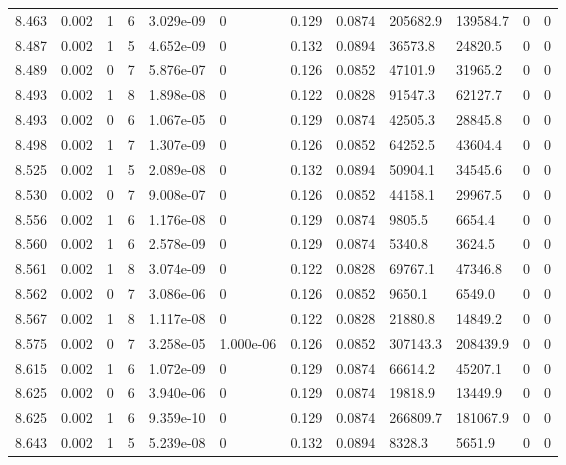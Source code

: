 \documentclass[preview]{standalone}
\begin{document}
{{{{{{{{{{\begin{tabular}{L{1.2cm}C{1.2cm} C{0.3cm}C{0.5cm} C{1.4cm}C{1.4cm} C{1.4cm}C{1.4cm} C{1.6cm}C{1.6cm} C{1.6cm}C{1.6cm}}
  8.463  &  0.002  & 1     &  6 &  3.029e-09  & 0  &  0.129&   0.0874& 205682.9 & 139584.7   &  0 & 0  \\ 
  8.487  &  0.002  & 1     &  5 &  4.652e-09  & 0  &  0.132&   0.0894& 36573.8 & 24820.5   &  0 & 0  \\ 
  8.489  &  0.002  & 0     &  7 &  5.876e-07  & 0  &  0.126&   0.0852& 47101.9 & 31965.2   &  0 & 0  \\ 
  8.493  &  0.002  & 1     &  8 &  1.898e-08  & 0  &  0.122&   0.0828& 91547.3 & 62127.7   &  0 & 0  \\ 
  8.493  &  0.002  & 0     &  6 &  1.067e-05  & 0  &  0.129&   0.0874& 42505.3 & 28845.8   &  0 & 0  \\ 
  8.498  &  0.002  & 1     &  7 &  1.307e-09  & 0  &  0.126&   0.0852& 64252.5 & 43604.4   &  0 & 0  \\ 
  8.525  &  0.002  & 1     &  5 &  2.089e-08  & 0  &  0.132&   0.0894& 50904.1 & 34545.6   &  0 & 0  \\ 
  8.530  &  0.002  & 0     &  7 &  9.008e-07  & 0  &  0.126&   0.0852& 44158.1 & 29967.5   &  0 & 0  \\ 
  8.556  &  0.002  & 1     &  6 &  1.176e-08  & 0  &  0.129&   0.0874& 9805.5 & 6654.4   &  0 & 0  \\ 
  8.560  &  0.002  & 1     &  6 &  2.578e-09  & 0  &  0.129&   0.0874& 5340.8 & 3624.5   &  0 & 0  \\ 
  8.561  &  0.002  & 1     &  8 &  3.074e-09  & 0  &  0.122&   0.0828& 69767.1 & 47346.8   &  0 & 0  \\ 
  8.562  &  0.002  & 0     &  7 &  3.086e-06  & 0  &  0.126&   0.0852& 9650.1 & 6549.0   &  0 & 0  \\ 
  8.567  &  0.002  & 1     &  8 &  1.117e-08  & 0  &  0.122&   0.0828& 21880.8 & 14849.2   &  0 & 0  \\ 
  8.575  &  0.002  & 0     &  7 &  3.258e-05  & 1.000e-06  &  0.126&   0.0852& 307143.3 & 208439.9   &  0 & 0  \\ 
  8.615  &  0.002  & 1     &  6 &  1.072e-09  & 0  &  0.129&   0.0874& 66614.2 & 45207.1   &  0 & 0  \\ 
  8.625  &  0.002  & 0     &  6 &  3.940e-06  & 0  &  0.129&   0.0874& 19818.9 & 13449.9   &  0 & 0  \\ 
  8.625  &  0.002  & 1     &  6 &  9.359e-10  & 0  &  0.129&   0.0874& 266809.7 & 181067.9   &  0 & 0  \\ 
  8.643  &  0.002  & 1     &  5 &  5.239e-08  & 0  &  0.132&   0.0894& 8328.3 & 5651.9   &  0 & 0  \\ 

\end{tabular}}}}}}}}}}}
\end{document}
